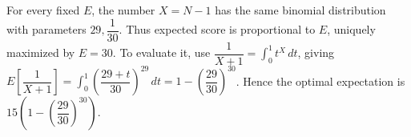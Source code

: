 For every fixed $E$, the number $X=N-1$ has the same binomial distribution with parameters $29,\dfrac{1}{30}$. Thus expected score is proportional to $E$, uniquely maximized by $\boxed{E=30}$. To evaluate it, use $\dfrac{1}{X+1}=\int_0^1t^X\,dt$, giving $E[\dfrac{1}{X+1}]=\int_0^1(\dfrac{29+t}{30})^{29}\,dt=1-(\dfrac{29}{30})^{30}$. Hence the optimal expectation is $\boxed{15\left(1-(\dfrac{29}{30})^{30}\right)}$.
